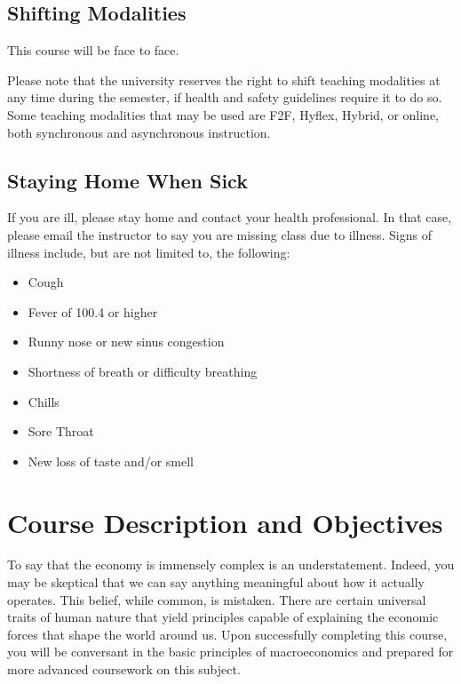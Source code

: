 \documentclass[11pt,]{article}
\providecommand{\tightlist}{%
  \setlength{\itemsep}{0pt}\setlength{\parskip}{0pt}}
\begin{document}
\hypertarget{shifting-modalities}{%
\subsection{Shifting Modalities}\label{shifting-modalities}}

This course will be face to face.

Please note that the university reserves the right to shift teaching modalities at any time during the semester, if
health and safety guidelines require it to do so. Some teaching modalities that may be used are
F2F, Hyflex, Hybrid, or online, both synchronous and asynchronous instruction.

\hypertarget{staying-home-when-sick}{%
\subsection{Staying Home When Sick}\label{staying-home-when-sick}}

If you are ill, please stay home and contact your health professional. In that case, please email the instructor to
say you are missing class due to illness. Signs of illness include, but are not limited to, the following:

\begin{itemize}
\tightlist
\item
  Cough
\item
  Fever of 100.4 or higher
\item
  Runny nose or new sinus congestion
\item
  Shortness of breath or difficulty
  breathing
\item
  Chills
\item
  Sore Throat
\item
  New loss of taste and/or smell
\end{itemize}

\hypertarget{course-description-and-objectives}{%
\section*{Course Description and Objectives}\label{course-description-and-objectives}}

To say that the economy is immensely complex is an understatement. Indeed, you may be skeptical that we can say anything meaningful about how it actually operates. This belief, while common, is mistaken.
There are certain universal traits of human nature that yield principles capable of explaining the economic
forces that shape the world around us. Upon successfully completing this course, you will be conversant in the basic principles of macroeconomics and prepared for more advanced coursework on this subject.
\end{document}
